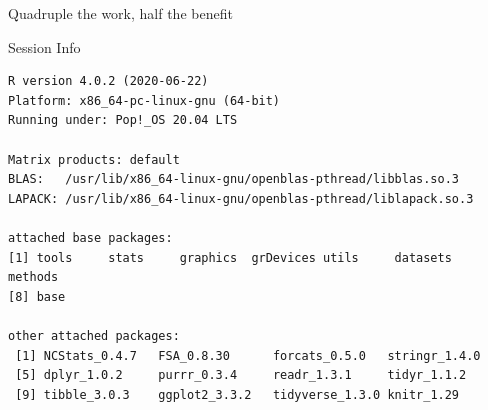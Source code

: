 \documentclass[10pt,handout]{beamer}\usepackage[]{graphicx}\usepackage[]{color}
\makeatletter
\newenvironment{kframe}{%
 \def\at@end@of@kframe{}%
 \ifinner\ifhmode%
  \def\at@end@of@kframe{\end{minipage}}%
  \begin{minipage}{\columnwidth}%
 \fi\fi%
 \def\FrameCommand##1{\hskip\@totalleftmargin \hskip-\fboxsep
 \colorbox{shadecolor}{##1}\hskip-\fboxsep
     \hskip-\linewidth \hskip-\@totalleftmargin \hskip\columnwidth}%
 \MakeFramed {\advance\hsize-\width
   \@totalleftmargin\z@ \linewidth\hsize
   \@setminipage}}%
 {\par\unskip\endMakeFramed%
 \at@end@of@kframe}
\newenvironment{knitrout}{}{} %
\makeatother
\begin{document}
\begin{frame}[fragile]{Quadruple the work, half the benefit}
	
\end{frame}

	\begin{frame}[fragile]{Session Info}
	\tiny
	
\begin{knitrout}\tiny
{}\color{fgcolor}\begin{kframe}
\begin{verbatim}
R version 4.0.2 (2020-06-22)
Platform: x86_64-pc-linux-gnu (64-bit)
Running under: Pop!_OS 20.04 LTS

Matrix products: default
BLAS:   /usr/lib/x86_64-linux-gnu/openblas-pthread/libblas.so.3
LAPACK: /usr/lib/x86_64-linux-gnu/openblas-pthread/liblapack.so.3

attached base packages:
[1] tools     stats     graphics  grDevices utils     datasets  methods  
[8] base     

other attached packages:
 [1] NCStats_0.4.7   FSA_0.8.30      forcats_0.5.0   stringr_1.4.0  
 [5] dplyr_1.0.2     purrr_0.3.4     readr_1.3.1     tidyr_1.1.2    
 [9] tibble_3.0.3    ggplot2_3.3.2   tidyverse_1.3.0 knitr_1.29     


\end{verbatim}
\end{kframe}
\end{knitrout}
\end{frame}
\end{document}
